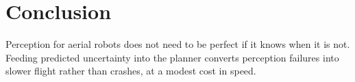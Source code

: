 \chapter{Conclusion}
\label{ch:conclusion}

Perception for aerial robots does not need to be perfect if it knows when it is not. Feeding
predicted uncertainty into the planner converts perception failures into slower flight rather
than crashes, at a modest cost in speed.

